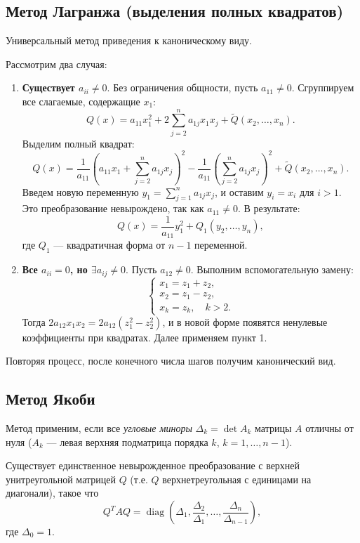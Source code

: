 \documentclass[12pt]{article}
\begin{document}
\subsection{Метод Лагранжа (выделения полных квадратов)}
Универсальный метод приведения к каноническому виду.

\begin{stat}
Рассмотрим два случая:
\begin{enumerate}
    \item \textbf{Существует $a_{ii} \neq 0$}. Без ограничения общности, пусть $a_{11} \neq 0$. Сгруппируем все слагаемые, содержащие $x_1$:
    \[
    Q(x) = a_{11}x_1^2 + 2\sum_{j=2}^n a_{1j}x_1x_j + \tilde{Q}(x_2,\dots,x_n).
    \]
    Выделим полный квадрат:
    \[
    Q(x) = \frac{1}{a_{11}}\left( a_{11}x_1 + \sum_{j=2}^n a_{1j}x_j \right)^2 - \frac{1}{a_{11}} \left( \sum_{j=2}^n a_{1j}x_j \right)^2 + \tilde{Q}(x_2,\dots,x_n).
    \]
    Введем новую переменную $y_1 = \sum_{j=1}^n a_{1j}x_j$, и оставим $y_i = x_i$ для $i>1$. Это преобразование невырождено, так как $a_{11} \neq 0$. В результате:
    \[
    Q(x) = \frac{1}{a_{11}} y_1^2 + Q_1(y_2,\dots,y_n),
    \]
    где $Q_1$ --- квадратичная форма от $n-1$ переменной.
    \item \textbf{Все $a_{ii}=0$, но $\exists a_{ij}\neq0$}. Пусть $a_{12}\neq0$. Выполним вспомогательную замену:
    \[
    \begin{cases}
    x_1 = z_1 + z_2, \\
    x_2 = z_1 - z_2, \\
    x_k = z_k, \quad k>2.
    \end{cases}
    \]
    Тогда $2a_{12}x_1x_2 = 2a_{12}(z_1^2 - z_2^2)$, и в новой форме появятся ненулевые коэффициенты при квадратах. Далее применяем пункт 1.
\end{enumerate}
Повторяя процесс, после конечного числа шагов получим канонический вид.
\end{stat}

\subsection{Метод Якоби}
Метод применим, если все \textit{угловые миноры} $\Delta_k = \det A_k$ матрицы $A$ отличны от нуля ($A_k$ --- левая верхняя подматрица порядка $k$, $k=1,\dots,n-1$).

\begin{theorem}[Якоби]
Существует единственное невырожденное преобразование с верхней унитреугольной матрицей $Q$ (т.е. $Q$ верхнетреугольная с единицами на диагонали), такое что
\[
Q^T A Q = \operatorname{diag}\left( \Delta_1, \frac{\Delta_2}{\Delta_1}, \dots, \frac{\Delta_n}{\Delta_{n-1}} \right),
\]
где $\Delta_0 = 1$.
\end{theorem}
\end{document}
